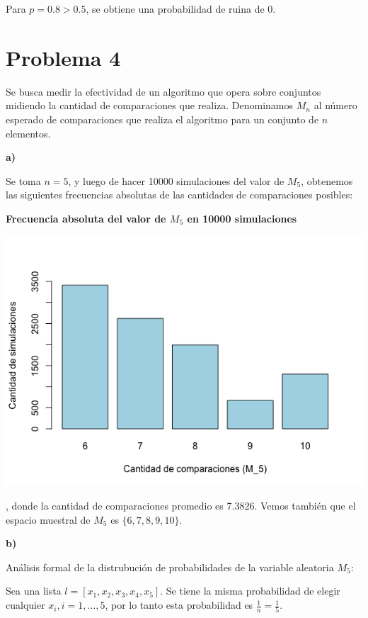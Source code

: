 \documentclass[11pt]{article}
\begin{document}
Para $p = 0.8 > 0.5$, se obtiene una probabilidad de ruina de 0.


\section*{Problema 4}

Se busca medir la efectividad de un algoritmo que opera sobre conjuntos midiendo la cantidad de comparaciones que realiza. Denominamos $M_n$ al número esperado de comparaciones que realiza el algoritmo para un conjunto de $n$ elementos.

\textbf{a)}

Se toma $n = 5$, y luego de hacer 10000 simulaciones del valor de $M_5$, obtenemos las siguientes frecuencias absolutas de las cantidades de comparaciones posibles:

\begin{center}\large\textbf{Frecuencia absoluta del valor de $M_5$ en 10000 simulaciones}\end{center}
\vspace{-0.9cm}
\begin{center}\includegraphics[scale = 0.5]{M_5EJ4.png}\end{center}

, donde la cantidad de comparaciones promedio es 7.3826. Vemos también que el espacio muestral de $M_5$ es $\{6,7,8,9,10\}$.

\textbf{b)}

Análisis formal de la distrubución de probabilidades de la variable aleatoria $M_5$:

Sea una lista $l = [x_1, x_2, x_3, x_4, x_5]$. Se tiene la misma probabilidad de elegir cualquier $x_i, i = 1, \dots ,5$, por lo tanto esta probabilidad es $\frac{1}{n} = \frac{1}{5}$.
\end{document}
